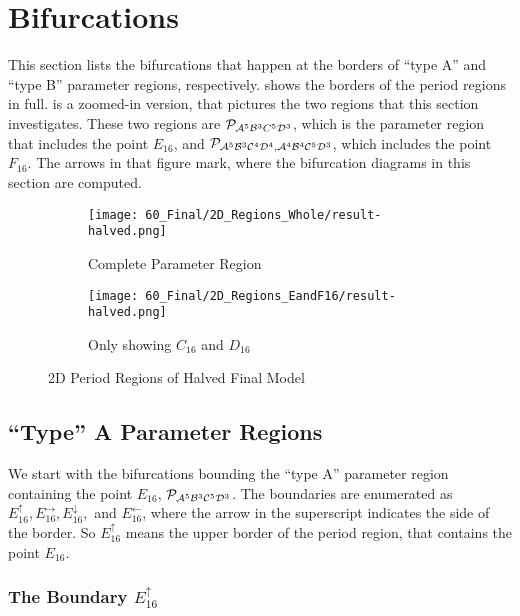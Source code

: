 \section{Bifurcations}

This section lists the bifurcations that happen at the borders of ``type A'' and ``type B'' parameter regions, respectively.
 shows the borders of the period regions in full.
 is a zoomed-in version, that pictures the two regions that this section investigates.
These two regions are $\mathcal{P}_{\mathcal{A}^5\mathcal{B}^3C^5\mathcal{D}^3}$, which is the parameter region that includes the point $E_{16}$, and $\mathcal{P}_{\mathcal{A}^5\mathcal{B}^3\mathcal{C}^4\mathcal{D}^4, \mathcal{A}^4\mathcal{B}^4\mathcal{C}^5\mathcal{D}^3}$, which includes the point $F_{16}$.
The arrows in that figure mark, where the bifurcation diagrams in this section are computed.

\begin{figure}
    \centering
    \begin{subfigure}{0.4\textwidth}
        \centering
        \texttt{[image: 60\_Final/2D\_Regions\_Whole/result-halved.png]}
        \caption{Complete Parameter Region}
        \label{fig:final.regions.whole.halved}
    \end{subfigure}
    \begin{subfigure}{0.4\textwidth}
        \centering
        \texttt{[image: 60\_Final/2D\_Regions\_EandF16/result-halved.png]}
        \caption{Only showing $C_{16}$ and $D_{16}$}
        \label{fig:final.regions.EandF16.halved}
    \end{subfigure}
    \caption{2D Period Regions of Halved Final Model}
\end{figure}

\subsection{``Type'' A Parameter Regions}

We start with the bifurcations bounding the ``type A'' parameter region containing the point $E_{16}$, $\mathcal{P}_{\mathcal{A}^5\mathcal{B}^3\mathcal{C}^5\mathcal{D}^3}$.
The boundaries are enumerated as $E_{16}^\uparrow, E_{16}^\rightarrow, E_{16}^\downarrow,$ and $E_{16}^\leftarrow$, where the arrow in the superscript indicates the side of the border.
So $E_{16}^\uparrow$ means the upper border of the period region, that contains the point $E_{16}$.

\subsubsection{The Boundary $E_{16}^\uparrow$}
\label{sec:final.bifurcation.typeA.up}

